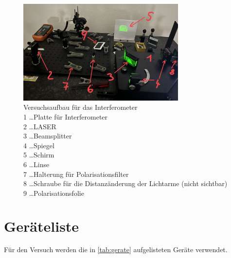 \documentclass[12pt,english,ngerman]{scrartcl}
\begin{document}
\begin{figure}[H]
	\begin{center}
		\includegraphics[width =0.75\textwidth]{./figures/aufbau_interferometer.jpg}
	\end{center}
	\caption[Versuchsaufbau für das Interferometer] { Versuchsaufbau für das Interferometer                                   \\
		1 \dots Platte für Interferometer                                       \\
		2 \dots LASER                                                           \\
		3 \dots Beamsplitter                                                    \\
		4 \dots Spiegel                                                         \\
		5 \dots Schirm                                                          \\
		6 \dots Linse                                                           \\
		7 \dots Halterung für Polarisationsfilter                               \\
		8 \dots Schraube für die Distanzänderung der Lichtarme (nicht sichtbar) \\
		9 \dots Polarisationsfolie                                              \\
	}\label{fig:aufbau_interferometer}
\end{figure}

\newpage

\section{Geräteliste}\label{sec:geraeteliste}

Für den Versuch werden die in \autoref{tab:gerate} aufgelisteten Geräte
verwendet.
\end{document}
